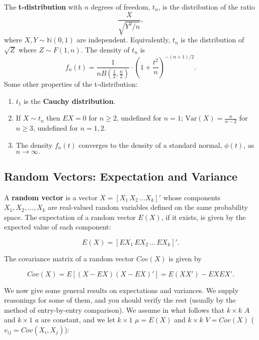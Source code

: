 \documentclass[12pt,oneside]{article}
\begin{document}
\noindent The \textbf{t-distribution} with $n$ degrees of freedom, $t_n$, is the distribution of the ratio
\[\frac{X}{\sqrt{Y^2/n}},\]
where $X,Y \sim \mathbb{N}(0,1)$ are independent.  Equivalently, $t_n$ is the distribution of $\sqrt{Z}$ where $Z \sim F(1,n)$. The density of $t_n$ is
\[f_n(t) = \frac{1}{nB\left(\frac{1}{2},\frac{n}{2}\right)} \cdot \left(1+\frac{t^2}{n}\right)^{-(n+1)/2}. \]
Some other properties of the t-distribution:
\begin{enumerate}
\item $t_1$ is the \textbf{Cauchy distribution}.
\item If $X \sim t_n$ then $EX = 0$ for $n \geq 2$, undefined for $n=1$; $\mbox{Var}(X) = \frac{n}{n-2}$ for $n \geq 3$, undefined for $n=1,2$.
\item The density $f_n(t)$ converges to the density of a standard normal, $\phi(t)$, as $n \rightarrow \infty.$
\end{enumerate}


\subsection{Random Vectors: Expectation and Variance}
A \textbf{random vector} is a vector $X = [X_1 \, X_2 \, ... X_k]'$ whose components $X_1, X_2,...,X_k$ are real-valued random variables defined on the same probability space.  The expectation of a random vector $E(X)$, if it exists, is given by the expected value of each component:

\[E(X) = [EX_1 \, EX_2 \, ... \, EX_k]'.\]

The covariance matrix of a random vector $Cov(X)$ is given by

\[Cov(X) = E[(X-EX)(X-EX)']=E(XX')-EXEX'.\]



We now give some general results on expectations and variances. We supply
reasonings for some of them, and you should verify the rest (usually
by the method of entry-by-entry comparison). We assume in what follows
that $k \times k$ $A$ and $k \times 1$ $a$ are constant, and we let
$k \times 1$ $ \mu = E(X)$ and $k \times k$ $V = Cov(X)$ ($v_{ij} =
Cov(X_i, X_j)$):
\end{document}
